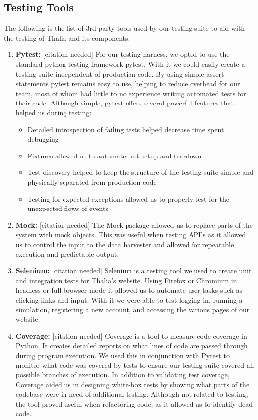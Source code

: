 \documentclass[main.tex]{subfiles}
\begin{document}
\subsection{Testing Tools}
The following is the list of 3rd party tools used by our testing suite to aid with the testing of Thalia and its components:

\begin{enumerate}
\item \textbf{Pytest: }[citation needed]
For our testing harness, we opted to use the standard python testing framework pytest. With it we could easily create a testing suite independent of production code. By using simple assert statements pytest remains easy to use, helping to reduce overhead for our team, most of whom had little to no experience writing automated tests for their code. Although simple, pytest offers several powerful features that helped us during testing:
\begin{itemize}
\item Detailed introspection of failing tests helped decrease time spent debugging
\item Fixtures allowed us to automate test setup and teardown
\item Test discovery helped to keep the structure of the testing suite simple and physically separated from production code
\item Testing for expected exceptions allowed us to  properly test for the unexpected flows of events
\end{itemize}


\item \textbf{Mock: } [citation needed]
The Mock package allowed us to replace parts of the system with mock objects. This was useful when testing API’s as it allowed us to control the input to the data harvester and allowed for repeatable execution and predictable output.

\item \textbf{Selenium: } [citation needed]
Selenium is a testing tool we used to create unit and integration tests for Thalia’s website. Using Firefox or Chromium in headless or full browser mode it allowed us to automate user tasks such as clicking links and input. With it we were able to test logging in, running a simulation, registering a new account, and accessing the various pages of our website.

\item \textbf{Coverage: } [citation needed]
Coverage is a tool to measure code coverage in Python. It creates detailed reports on what lines of code are passed through during program execution. We used this in conjunction with Pytest to monitor what code was covered by tests to ensure our testing suite covered all possible branches of execution. In addition to validating test coverage, Coverage aided us in designing white-box tests by showing what parts of the codebase were in need of additional testing. Although not related to testing, the tool proved useful when refactoring code, as it allowed us to identify dead code.

\end{enumerate}
\end{document}
